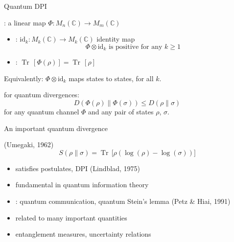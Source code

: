 \documentclass[mathserif]{beamer}
\newcommand{\<}{\langle}
\renewcommand{\>}{\rangle}
\newcommand{\Tr}{\operatorname{Tr}\,}
\begin{document}
\begin{frame}{Quantum DPI}


:  a linear map $\Phi: M_n(\mathbb C)\to M_m(\mathbb C)$


\medskip

\begin{itemize}
\item {}:  
$\mathrm{id}_k :M_k(\mathbb C)\to M_k(\mathbb C)$ identity map
\[
\Phi\otimes \mathrm{id}_k\text{ is
positive for any }k\ge 1
\]
\item {}: $\Tr[\Phi(\rho)]=\Tr[\rho]$
\end{itemize}

\medskip
Equivalently: $\Phi\otimes \mathrm{id}_k$ maps states to states, for all $k$.

\bigskip
{} for quantum divergences:
\[
D(\Phi(\rho)\|\Phi(\sigma))\le D(\rho\|\sigma)
\]
for any quantum channel $\Phi$ and any pair of states $\rho$, $\sigma$.
\end{frame}



\begin{frame}{An important quantum divergence}

  {\small (Umegaki, 1962)}
\[
S(\rho\| \sigma)=\Tr\bigl[\rho\left(\log(\rho)-\log(\sigma)\right)\bigr]
\]

\begin{itemize}
\item satisfies postulates, DPI {\small (Lindblad, 1975)}
\vskip 2mm
\item fundamental in quantum information theory
\vskip 2mm
\item {}:  quantum communication,
quantum Stein's lemma {\small (Petz \& Hiai, 1991)}
\item related to many important quantities
\item entanglement measures, uncertainty relations
\end{itemize}



\end{frame}
\end{document}
